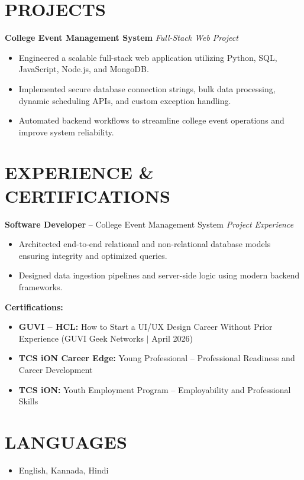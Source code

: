 \documentclass[10pt,a4paper]{article}
\begin{document}
\section*{PROJECTS}
\textbf{College Event Management System} \hfill \textit{Full-Stack Web Project}
\begin{itemize}[leftmargin=*, noitemsep, topsep=2pt]
    \item Engineered a scalable full-stack web application utilizing Python, SQL, JavaScript, Node.js, and MongoDB.
    \item Implemented secure database connection strings, bulk data processing, dynamic scheduling APIs, and custom exception handling.
    \item Automated backend workflows to streamline college event operations and improve system reliability.
\end{itemize}

\section*{EXPERIENCE \& CERTIFICATIONS}
\textbf{Software Developer} -- College Event Management System \hfill \textit{Project Experience}
\begin{itemize}[leftmargin=*, noitemsep, topsep=2pt]
    \item Architected end-to-end relational and non-relational database models ensuring integrity and optimized queries.
    \item Designed data ingestion pipelines and server-side logic using modern backend frameworks.
\end{itemize}

\vspace{6pt}
\textbf{Certifications:}
\begin{itemize}[leftmargin=*, noitemsep, topsep=2pt]
    \item \textbf{GUVI -- HCL:} How to Start a UI/UX Design Career Without Prior Experience (GUVI Geek Networks $|$ April 2026)
    \item \textbf{TCS iON Career Edge:} Young Professional -- Professional Readiness and Career Development
    \item \textbf{TCS iON:} Youth Employment Program -- Employability and Professional Skills
\end{itemize}

\section*{LANGUAGES}
\begin{itemize}[leftmargin=*, noitemsep, topsep=0pt]
    \item English, Kannada, Hindi
\end{itemize}
\end{document}
